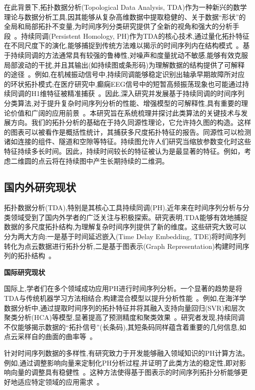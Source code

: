 在此背景下,拓扑数据分析(Topological Data Analysis, TDA)\cite{JSJC20250411004}作为一种新兴的数学理论与数据分析工具,因其能够从复杂高维数据中提取稳健的、关于数据“形状”的全局和局部拓扑不变量,为时间序列分类研究提供了全新的视角和强大的分析手段~。持续同调(Persistent Homology, PH)作为TDA的核心技术,通过量化拓扑特征在不同尺度下的演化,能够捕捉到传统方法难以揭示的时间序列内在结构模式~。基于持续同调的方法通常具有较强的鲁棒性,对噪声和度量扰动不敏感,能够有效克服局部波动的干扰,并且其输出(如持续图或条形码)为理解数据的结构提供了可解释的途径~。例如,在机械振动信号中,持续同调能够稳定识别出轴承早期故障所对应的环状拓扑模式;在医疗研究中,癫痫EEG信号中的短暂高频振荡现象也可能通过持续同调的H1维特征被精准捕获~。因此,深入研究并发展基于持续同调的时间序列分类算法,对于提升复杂时间序列分析的性能、增强模型的可解释性,具有重要的理论价值和广阔的应用前景~。本研究旨在系统梳理并探讨此类算法的关键技术与发展方向。我们的拓扑分析的基础在于持久同源性理论，它允许持久图的构造。这样的图表可以被看作是概括性统计，其捕获多尺度拓扑特征的报告\cite{fasy2014confidence}。同源性可以检测诸如连接的组件、隧道和空隙等特征。持续图允许人们研究当缩放参数变化时这些特征持续多长时间。因此，持续时间较长的特征被认为是最显著的特征。例如，考虑二维圆的点云将在持续图中产生长期持续的二维洞。


\subsection{国内外研究现状}
拓扑数据分析(TDA),特别是其核心工具持续同调(PH),近年来在时间序列分析与分类领域受到了国内外学者的广泛关注与积极探索。研究表明,TDA能够有效地捕捉数据的多尺度拓扑结构,为理解复杂时间序列提供了新的维度。这些研究大致可以分为两大方向:一是基于时间延迟嵌入(Time Delay Embedding, TDE)将时间序列转化为点云数据进行拓扑分析,二是基于图表示(Graph Representation)构建时间序列的拓扑结构~。

\textbf{国际研究现状}

国际上,学者们在多个领域成功应用PH进行时间序列分析。一个显著的趋势是将TDA与传统机器学习方法相结合,构建混合模型以提升分析性能~。例如,在海洋学数据分析中,通过提取时间序列的拓扑特征并将其融入支持向量回归(SVR)和层次聚类分析(HCA)等模型,显著提高了预测精度和聚类效果~。\cite{lin2025hybridizing}研究者发现,持续同调不仅能够揭示数据的“拓扑信号”(长条码),其短条码同样蕴含着重要的几何信息,如点云采样自的曲面的曲率等~。

针对时间序列数据的多样性,有研究致力于开发能够融入领域知识的PH计算方法。\cite{2}例如,通过调整影响向量来定制化PH分析过程,并证明了此类方法的稳定性,即对影响向量的调整具有稳健性~。这种方法使得基于图表示的时间序列拓扑分析能够更好地适应特定领域的应用需求~。

